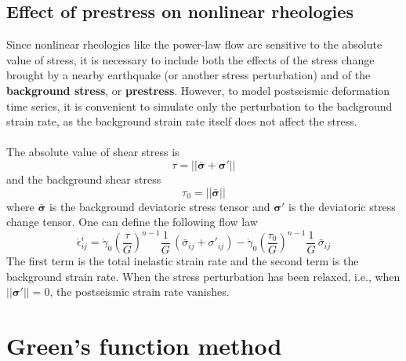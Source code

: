 \documentclass[letterpaper,12pt,]{memoir}
\begin{document}
\subsection{Effect of prestress on nonlinear rheologies}

Since nonlinear rheologies like the power-law flow are sensitive to the absolute value of stress, it is necessary to include both the effects of the stress change brought by a nearby earthquake (or another stress perturbation) and of the \textbf{background stress}, or \textbf{prestress}. However, to model postseismic deformation time series, it is convenient to simulate only the perturbation to the background strain rate, as the background strain rate itself does not affect the stress. \\
\\
The absolute value of shear stress is
\begin{equation}
\tau=\big|\big|\bar{\boldsymbol{\sigma}}+\boldsymbol{\sigma}'\big|\big|
\end{equation}
and the background shear stress
\begin{equation}
\tau_0=\big|\big|\bar{\boldsymbol{\sigma}}\big|\big|
\end{equation}
where $\bar{\boldsymbol{\sigma}}$ is the background deviatoric stress tensor and $\boldsymbol{\sigma}'$ is the deviatoric stress change tensor. One can define the following flow law
\begin{equation}
\dot{\epsilon}_{ij}^i=\dot{\gamma}_0\left(\frac{\tau}{G}\right)^{n-1}\frac{1}{G}\,\left(\bar{\sigma}_{ij}+\sigma'_{ij}\right)-\dot{\gamma}_0\left(\frac{\tau_0}{G}\right)^{n-1}\frac{1}{G}\,\bar{\sigma}_{ij}
\end{equation}
The first term is the total inelastic strain rate and the second term is the background strain rate. When the stress perturbation has been relaxed, i.e., when $\big|\big|\boldsymbol{\sigma}'\big|\big|=0$, the postseismic strain rate vanishes.

\section{Green's function method}
\end{document}
